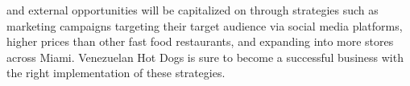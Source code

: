  and external opportunities will be capitalized on through strategies such as marketing campaigns targeting their target audience via social media platforms, higher prices than other fast food restaurants, and expanding into more stores across Miami. Venezuelan Hot Dogs is sure to become a successful business with the right implementation of these strategies.